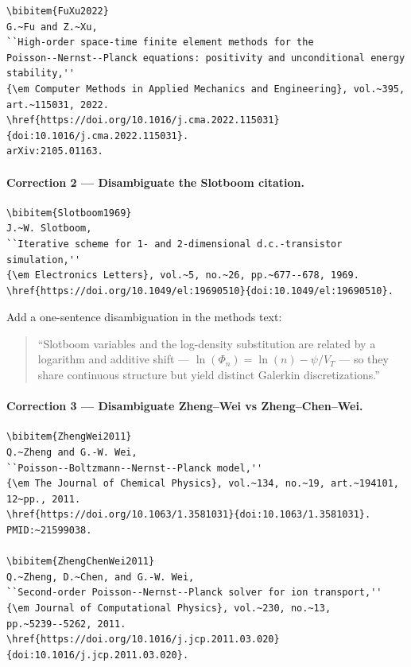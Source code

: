 \documentclass[11pt]{article}
\newcommand{\VT}{V_{T}}
\begin{document}
\begin{lstlisting}[style=bibstyle]
\bibitem{FuXu2022}
G.~Fu and Z.~Xu,
``High-order space-time finite element methods for the
Poisson--Nernst--Planck equations: positivity and unconditional energy
stability,''
{\em Computer Methods in Applied Mechanics and Engineering}, vol.~395,
art.~115031, 2022.
\href{https://doi.org/10.1016/j.cma.2022.115031}{doi:10.1016/j.cma.2022.115031}.
arXiv:2105.01163.
\end{lstlisting}

\paragraph{Correction 2 --- Disambiguate the Slotboom citation.}

\begin{lstlisting}[style=bibstyle]
\bibitem{Slotboom1969}
J.~W. Slotboom,
``Iterative scheme for 1- and 2-dimensional d.c.-transistor simulation,''
{\em Electronics Letters}, vol.~5, no.~26, pp.~677--678, 1969.
\href{https://doi.org/10.1049/el:19690510}{doi:10.1049/el:19690510}.
\end{lstlisting}

Add a one-sentence disambiguation in the methods text:
\begin{quote}
\small
``Slotboom variables and the log-density substitution are related by a
logarithm and additive shift --- $\ln(\Phi_n)=\ln(n)-\psi/\VT$ --- so they
share continuous structure but yield distinct Galerkin discretizations.''
\end{quote}

\paragraph{Correction 3 --- Disambiguate Zheng--Wei vs Zheng--Chen--Wei.}

\begin{lstlisting}[style=bibstyle]
\bibitem{ZhengWei2011}
Q.~Zheng and G.-W. Wei,
``Poisson--Boltzmann--Nernst--Planck model,''
{\em The Journal of Chemical Physics}, vol.~134, no.~19, art.~194101,
12~pp., 2011.
\href{https://doi.org/10.1063/1.3581031}{doi:10.1063/1.3581031}.
PMID:~21599038.

\bibitem{ZhengChenWei2011}
Q.~Zheng, D.~Chen, and G.-W. Wei,
``Second-order Poisson--Nernst--Planck solver for ion transport,''
{\em Journal of Computational Physics}, vol.~230, no.~13,
pp.~5239--5262, 2011.
\href{https://doi.org/10.1016/j.jcp.2011.03.020}{doi:10.1016/j.jcp.2011.03.020}.
\end{lstlisting}
\end{document}
